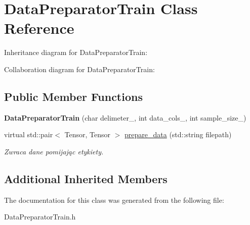 \hypertarget{classDataPreparatorTrain}{}\section{Data\+Preparator\+Train Class Reference}
\label{classDataPreparatorTrain}


Inheritance diagram for Data\+Preparator\+Train\+:


Collaboration diagram for Data\+Preparator\+Train\+:
\subsection*{Public Member Functions}
\begin{DoxyCompactItemize}
\item 
\mbox{\label{classDataPreparatorTrain_ad82f6c5f8497aff883c7bf6708a2e217}} 
{\bfseries Data\+Preparator\+Train} (char delimeter\+\_\+, int data\+\_\+cols\+\_\+, int sample\+\_\+size\+\_\+)
\item 
\mbox{\label{classDataPreparatorTrain_ae2b8b2efd0fb54682f6f72e1ed9f88fe}} 
virtual std\+::pair$<$ Tensor, Tensor $>$ \hyperlink{classDataPreparatorTrain_ae2b8b2efd0fb54682f6f72e1ed9f88fe}{prepare\+\_\+data} (std\+::string filepath)
\begin{DoxyCompactList}\small\item\em Zwraca dane pomijając etykiety. \end{DoxyCompactList}\end{DoxyCompactItemize}
\subsection*{Additional Inherited Members}


The documentation for this class was generated from the following file\+:\begin{DoxyCompactItemize}
\item 
Data\+Preparator\+Train.\+h\end{DoxyCompactItemize}
